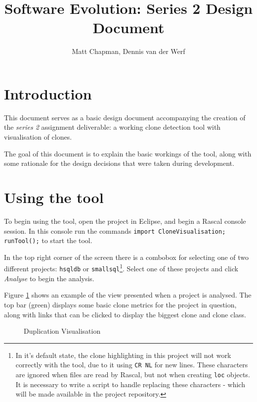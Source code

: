 \documentclass{article}
\title{Software Evolution: Series 2 Design Document}
\author{Matt Chapman, Dennis van der Werf}
\begin{document}
\maketitle
\section{Introduction}

This document serves as a basic design document accompanying the creation of the \textit{series 2} assignment deliverable: a working clone detection tool with visualisation of clones.

The goal of this document is to explain the basic workings of the tool, along with some rationale for the design decisions that were taken during development.

\section{Using the tool}
To begin using the tool, open the project in Eclipse, and begin a Rascal console session. In this console run the commands \texttt{import CloneVisualisation; runTool();} to start the tool.

In the top right corner of the screen there is a combobox for selecting one of two different projects: \texttt{hsqldb} or \texttt{smallsql}\footnote{In it's default state, the clone highlighting in this project will not work correctly with the tool, due to it using \texttt{CR NL} for new lines. These characters are ignored when files are read by Rascal, but not when creating \texttt{loc} objects. It is necessary to write a script to handle replacing these characters - which will be made available in the project repository.}. Select one of these projects and click \textit{Analyse} to begin the analysis.

Figure \ref{fig:shot1} shows an example of the view presented when a project is analysed. The top bar (green) displays some basic clone metrics for the project in question, along with links that can be clicked to display the biggest clone and clone class.\newpage

\begin{figure}[h]
\centering
{}
\caption{Duplication Visualisation}
\label{fig:shot1}
\end{figure}
\end{document}
